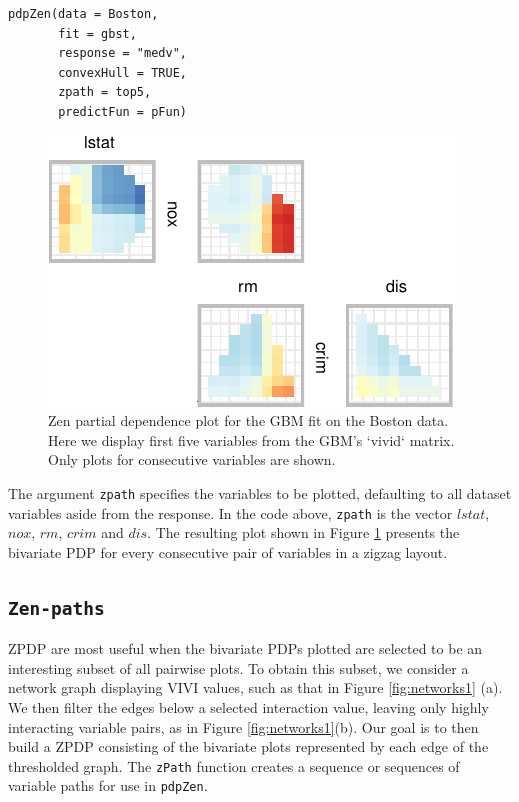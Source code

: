 \begin{verbatim}
pdpZen(data = Boston,
       fit = gbst,
       response = "medv",
       convexHull = TRUE,
       zpath = top5,
       predictFun = pFun)
\end{verbatim}

\begin{figure}

{\centering \includegraphics[width=0.5\linewidth]{vivid_files/figure-latex/zpdpGbm1-1} 

}

\caption{Zen partial dependence plot for the GBM fit on the Boston data. Here we display first five variables from the GBM's `vivid` matrix. Only plots for consecutive variables are shown.}\label{fig:zpdpGbm1}
\end{figure}

The argument \texttt{zpath} specifies the variables to be plotted, defaulting to all dataset variables aside from the response. In the code above, \texttt{zpath} is the vector \(lstat\), \(nox\), \(rm\), \(crim\) and \(dis\). The resulting plot shown in Figure \ref{fig:zpdpGbm1} presents the bivariate PDP for every consecutive pair of variables in a zigzag layout.

\hypertarget{sec:zp}{%
\subsection{\texorpdfstring{\texttt{Zen-paths}}{Zen-paths}}\label{sec:zp}}

ZPDP are most useful when the bivariate PDPs plotted are selected to be an interesting subset of all pairwise plots. To obtain this subset, we consider a network graph displaying VIVI values, such as that in Figure \ref{fig:networks1} (a). We then filter the edges below a selected interaction value, leaving only highly interacting variable pairs, as in Figure \ref{fig:networks1}(b). Our goal is to then build a ZPDP consisting of the bivariate plots represented by each edge of the thresholded graph. The \texttt{zPath} function creates a sequence or sequences of variable paths for use in \texttt{pdpZen}.

